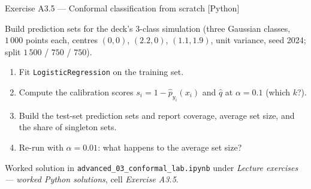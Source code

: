 \documentclass[aspectratio=169,11pt]{beamer}
\begin{document}
\begin{frame}{Exercise A3.5 --- Conformal classification from scratch [Python]}
\begin{exercise}
  Build prediction sets for the deck's 3-class simulation (three Gaussian classes,
  $1\,000$ points each, centres $(0,0)$, $(2.2, 0)$, $(1.1, 1.9)$, unit variance,
  seed 2024; split $1\,500$ / $750$ / $750$).
  \begin{enumerate}
    \item Fit \texttt{LogisticRegression} on the training set.
    \item Compute the calibration scores $s_i = 1 - \hat p_{y_i}(x_i)$ and $\hat q$
          at $\alpha = 0.1$ (which $k$?).
    \item Build the test-set prediction sets and report coverage, average set size,
          and the share of singleton sets.
    \item Re-run with $\alpha = 0.01$: what happens to the average set size?
  \end{enumerate}
\end{exercise}
\begin{labnote}
  Worked solution in \texttt{advanced\_03\_conformal\_lab.ipynb} under \emph{Lecture
  exercises --- worked Python solutions}, cell \emph{Exercise A3.5}.
\end{labnote}
\end{frame}
\end{document}
